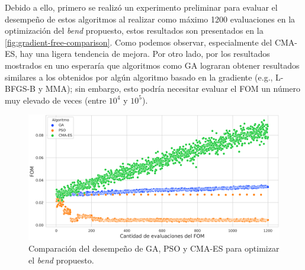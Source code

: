 Debido a ello, primero se realizó un experimento preliminar para evaluar el desempeño de estos
algoritmos al realizar como máximo 1200 evaluaciones en la optimización del \emph{bend} propuesto, 
estos resultados son presentados en la \autoref{fig:gradient-free-comparison}.
Como podemos observar, especialmente del CMA-ES, hay una ligera tendencia de mejora.
Por otro lado, por los resultados mostrados en \cite{Christiansen2021matlab} uno esperaría que algoritmos como GA lograran 
obtener resultados similares a los obtenidos por algún algoritmo basado en la gradiente (e.g., L-BFGS-B y MMA); 
sin embargo, esto podría necesitar evaluar el FOM un número muy elevado de veces (entre $10^4$ y $10^5$).

\begin{figure}[ht]
  \centering
  \includegraphics[width=1.0\textwidth]{image/proposal/bend-opt-cont.png}
  \caption{Comparación del desempeño de GA, PSO y CMA-ES para optimizar el \emph{bend} propuesto.}
  \label{fig:gradient-free-comparison}
\end{figure}

